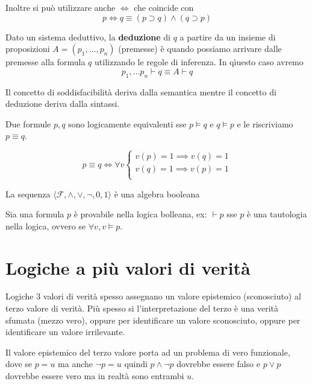 Inoltre si può utilizzare anche $\iff$ che coincide con
$$p\iff q \equiv (p\supset q) \land (q\supset p)$$


\begin{definizione} 
    Dato un sistema deduttivo, la \textbf{deduzione} di $q$ a partire da un insieme
    di proposizioni $A= (p_1,\dots, p_n)$ (premesse) è quando possiamo arrivare 
    dalle premesse alla formula $q$ utilizzando le regole di inferenza. In qìuesto 
    caso avremo 
    $$p_1,\dots p_n \vdash q \equiv A\vdash q$$
\end{definizione}

Il concetto di soddisfacibilità deriva dalla semantica mentre il concetto di 
deduzione deriva dalla sintassi.

\begin{definizione}
    Due formule $p,q$ sono logicamente equivalenti sse $p\vDash q$ e $q\vDash p$
    e le riscriviamo $p\equiv q$.
    
    $$p\equiv q \iff \forall v \begin{cases}
        v(p)=1 \implies v(q)=1\\
        v(q)=1 \implies v(p)=1\\
    \end{cases}$$
\end{definizione}
\begin{teorema}
    La sequenza $\langle \mathcal{F}, \land, \lor, \lnot, 0, 1\rangle$ è una 
    algebra booleana
\end{teorema}

\begin{teorema}
    Sia una formula $p$ è provabile nella logica bolleana, ex: $\vdash p$ sse 
    $p$ è una tautologia  nella logica, ovvero se $\forall v, v\vDash p$.
\end{teorema}


\section{Logiche a più valori di verità}

Logiche 3 valori di verità spesso assegnano un valore epistemico (sconosciuto) al
terzo valore di verità. Più spesso si l'interpretazione del terzo è una verità 
sfumata (mezzo vero), oppure per identificare un valore sconosciuto, oppure per 
identificare un valore irrilevante.

Il valore epistemico del terzo valore porta ad un problema di vero funzionale,
dove se $p=u$ ma anche $\lnot p =u$ quindi $p\land \lnot p$ dovrebbe essere falso 
e $p\lor p$ dovrebbe essere vero ma in realtà sono entrambi $u$.


